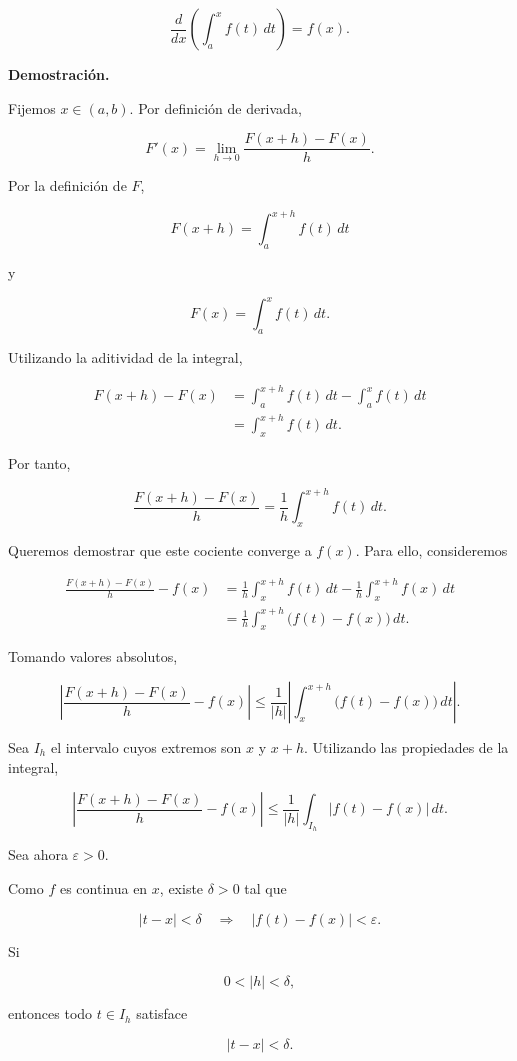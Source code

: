 \documentclass[12pt]{article}
\begin{document}
\[
\boxed{
\frac{d}{dx}
\left(
\int_a^x f(t)\,dt
\right)
=f(x).
}
\]

\textbf{Demostración.}

Fijemos $x\in(a,b)$. Por definición de derivada,

\[
F'(x)
=
\lim_{h\to0}
\frac{F(x+h)-F(x)}{h}.
\]

Por la definición de $F$,

\[
F(x+h)=\int_a^{x+h}f(t)\,dt
\]

y

\[
F(x)=\int_a^x f(t)\,dt.
\]

Utilizando la aditividad de la integral,

\begin{align*}
F(x+h)-F(x)
&=
\int_a^{x+h}f(t)\,dt
-
\int_a^x f(t)\,dt\\
&=
\int_x^{x+h}f(t)\,dt.
\end{align*}

Por tanto,

\[
\frac{F(x+h)-F(x)}{h}
=
\frac{1}{h}
\int_x^{x+h}f(t)\,dt.
\]

Queremos demostrar que este cociente converge a $f(x)$. Para ello,
consideremos

\begin{align*}
\frac{F(x+h)-F(x)}{h}-f(x)
&=
\frac{1}{h}\int_x^{x+h}f(t)\,dt
-
\frac{1}{h}\int_x^{x+h}f(x)\,dt\\
&=
\frac{1}{h}
\int_x^{x+h}
\bigl(f(t)-f(x)\bigr)\,dt.
\end{align*}

Tomando valores absolutos,

\[
\left|
\frac{F(x+h)-F(x)}{h}-f(x)
\right|
\leq
\frac{1}{|h|}
\left|
\int_x^{x+h}
\bigl(f(t)-f(x)\bigr)\,dt
\right|.
\]

Sea $I_h$ el intervalo cuyos extremos son $x$ y $x+h$. Utilizando las
propiedades de la integral,

\[
\left|
\frac{F(x+h)-F(x)}{h}-f(x)
\right|
\leq
\frac{1}{|h|}
\int_{I_h}
|f(t)-f(x)|\,dt.
\]

Sea ahora $\varepsilon>0$.

Como $f$ es continua en $x$, existe $\delta>0$ tal que

\[
|t-x|<\delta
\quad\Longrightarrow\quad
|f(t)-f(x)|<\varepsilon.
\]

Si

\[
0<|h|<\delta,
\]

entonces todo $t\in I_h$ satisface

\[
|t-x|<\delta.
\]
\end{document}
